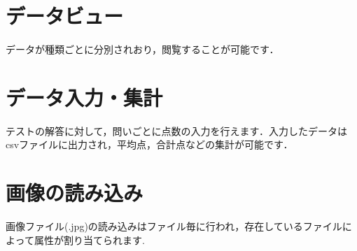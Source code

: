 \documentclass[12pt]{jsreport}
\begin{document}
\section{データビュー}
データが種類ごとに分別されおり，閲覧することが可能です．
\section{データ入力・集計}
テストの解答に対して，問いごとに点数の入力を行えます．入力したデータはcsvファイルに出力され，平均点，合計点などの集計が可能です．
\section{画像の読み込み}
画像ファイル(.jpg)の読み込みはファイル毎に行われ，存在しているファイルによって属性が割り当てられます.

\newpage
\end{document}
